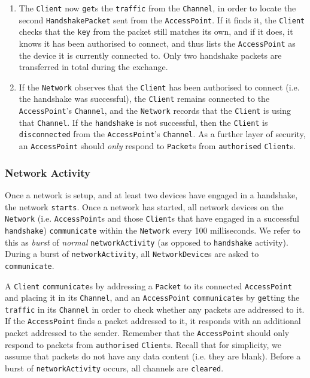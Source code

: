 \documentclass[11pt]{article}
\begin{document}
\begin{enumerate}
		\item The \texttt{Client} now \texttt{get}s the \texttt{traffic} from the \texttt{Channel}, in order to locate the second \texttt{HandshakePacket} sent from the \texttt{AccessPoint}. If it finds it, the \texttt{Client} checks that the \texttt{key} from the packet still matches its own, and if it does, it knows it has been authorised to connect, and thus lists the  \texttt{AccessPoint} as the device it is currently connected to. Only two handshake packets are transferred in total during the exchange. 
	
		\item If the \texttt{Network} observes that the \texttt{Client} has been authorised to connect (i.e. the handshake was successful), the \texttt{Client} remains connected to the \texttt{AccessPoint}'s \texttt{Channel}, and the \texttt{Network} records that the \texttt{Client} is using that \texttt{Channel}. If the \texttt{handshake} is not successful, then the \texttt{Client} is \texttt{disconnected} from the \texttt{AccessPoint}'s \texttt{Channel}. As a further layer of security, an \texttt{AccessPoint} should \emph{only} respond to \texttt{Packet}s from \texttt{authorised} \texttt{Client}s.
				
\end{enumerate} 

\subsubsection{Network Activity}

Once a network is setup, and at least two devices have engaged in a handshake, the network \texttt{starts}. Once a network has started, all network devices on the \texttt{Network} (i.e. \texttt{AccessPoint}s and those \texttt{Client}s that have engaged in a successful \texttt{handshake})  \texttt{communicate} within the \texttt{Network} every 100 milliseconds. We refer to this as \emph{burst} of \emph{normal} \texttt{networkActivity} (as opposed to \texttt{handshake} activity). During a burst of \texttt{networkActivity}, all \texttt{NetworkDevice}s are asked to \texttt{communicate}. 

A \texttt{Client} \texttt{communicate}s by addressing a \texttt{Packet} to its connected \texttt{AccessPoint} and placing it in its \texttt{Channel}, and an \texttt{AccessPoint} \texttt{communicate}s by \texttt{get}ting the \texttt{traffic} in its \texttt{Channel} in order to check whether any packets are addressed to it. If the \texttt{AccessPoint} finds a packet addressed to it, it responds with an additional packet addressed to the sender. Remember that the \texttt{AccessPoint} should only respond to packets from \texttt{authorised} \texttt{Client}s. Recall that for simplicity, we assume that packets do not have any data content (i.e. they are blank). Before a burst of \texttt{networkActivity} occurs, all channels are \texttt{cleared}.
\end{document}

